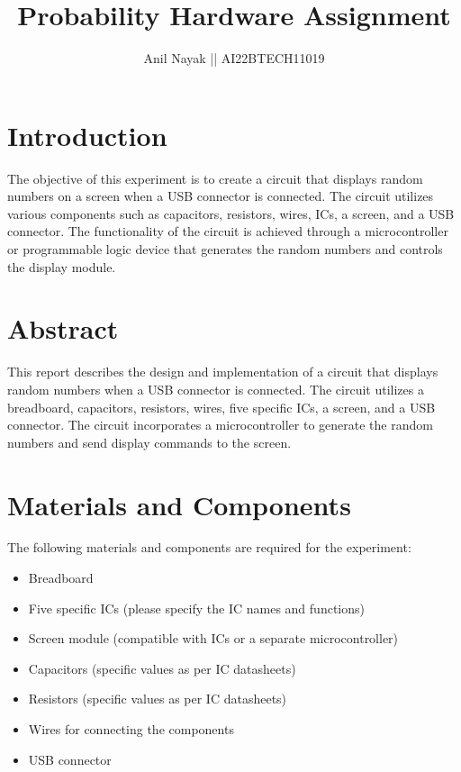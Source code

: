 \documentclass{article}
\begin{document}
\title{Probability Hardware Assignment}
\author{Anil Nayak || AI22BTECH11019}
\maketitle

\section{Introduction}
The objective of this experiment is to create a circuit that displays random numbers on a screen when a USB connector is connected. The circuit utilizes various components such as capacitors, resistors, wires, ICs, a screen, and a USB connector. The functionality of the circuit is achieved through a microcontroller or programmable logic device that generates the random numbers and controls the display module.
\section{Abstract}
This report describes the design and implementation of a circuit that displays random numbers when a USB connector is connected. The circuit utilizes a breadboard, capacitors, resistors, wires, five specific ICs, a screen, and a USB connector. The circuit incorporates a microcontroller to generate the random numbers and send display commands to the screen.

\section{Materials and Components}
The following materials and components are required for the experiment:
\begin{itemize}
  \item Breadboard
   \item Five specific ICs (please specify the IC names and functions)
  \item Screen module (compatible with ICs or a separate microcontroller)
  \item Capacitors (specific values as per IC datasheets)
  \item Resistors (specific values as per IC datasheets)
  \item Wires for connecting the components
  \item USB connector
\end{itemize}
\end{document}
